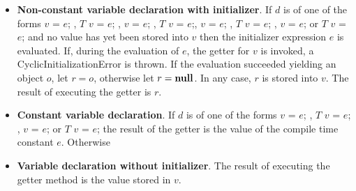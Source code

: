 \documentclass{article}
\newcommand{\code}[1]{{\sf #1}}
\begin{document}
\begin{itemize}
\item {\bf Non-constant variable declaration with initializer}. If $d$ is of one of the forms \code{\VAR{} $v$ = $e$;} ,  \code{$T$ $v$ = $e$;} ,   \code{\FINAL{} $v$ = $e$;} ,  \code{\FINAL{} $T$ $v$ = $e$;}, \code{\STATIC{} $v$ = $e$; }, \code{\STATIC{} $T$ $v$ = $e$; }, \code{\STATIC{} \FINAL{} $v$ = $e$; } or \code{\STATIC{} \FINAL{} $T$ $v$ = $e$;} and no value has yet been stored into $v$ then the initializer expression $e$ is evaluated. If, during the evaluation of $e$, the getter for $v$ is invoked, a \code{CyclicInitializationError} is thrown. If the evaluation succeeded yielding an object $o$, let $r = o$, otherwise let $r = \textbf{null}{}$. In any case, $r$ is stored into $v$. The result of executing the getter is $r$. %

\item  {\bf Constant variable declaration}. If $d$ is of one of the%
 forms \code{\CONST{} $v$ = $e$; } ,  \code{\CONST{} $T$  $v$ = $e$; },  %
\code{\STATIC{} \CONST{} $v$ = $e$; }  or%
\code{\STATIC{} \CONST{} $T$ $v$ = $e$;} the result of the getter is the value of the compile time constant $e$. 
Otherwise
\item {\bf Variable declaration without initializer}. The result of executing the getter method is the value stored in $v$.
\end{itemize}
\end{document}
